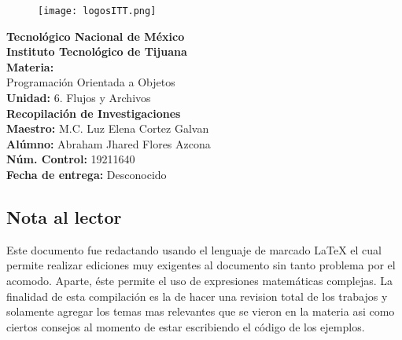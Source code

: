 \documentclass[letterpaper, 12pt]{article}
\begin{document}
    \thispagestyle{empty}
    \begin{figure}[ht]
        \centering
        \texttt{[image: logosITT.png]}
    \end{figure}
    \begin{LARGE}
        \centering
        \textbf{Tecnológico Nacional de México}
        \\
            \bigbreak
        \textbf{Instituto Tecnológico de Tijuana}
        \\
            \bigbreak
            \bigbreak
            \bigbreak
        \textbf{Materia:}
        \\
            \bigbreak
        Programación Orientada a Objetos
        \\
            \bigbreak 
            \bigbreak
            \bigbreak
        \textbf{Unidad:} 6. Flujos y Archivos
        \\
            \bigbreak
            \bigbreak
            \bigbreak 
        \textbf{Recopilación de Investigaciones}
        \\
            \bigbreak
            \bigbreak
            \bigbreak
        \textbf{Maestro:} M.C. Luz Elena Cortez Galvan
        \\
            \bigbreak
            \bigbreak
            \bigbreak 
        \textbf{Alúmno:} Abraham Jhared Flores Azcona
        \\
            \bigbreak
            \bigbreak
            \bigbreak
        \textbf{Núm. Control:} 19211640
        \\
            \bigbreak
            \bigbreak
            \bigbreak
        \textbf{Fecha de entrega:} Desconocido
        \\ 
    \end{LARGE}
    \thispagestyle{empty}

    \newpage
        \setcounter{page}{1}
        \begin{justify}
        \section*{\huge{Nota al lector}}
        Este documento fue redactando usando el lenguaje de marcado \LaTeX{} el cual permite 
        realizar ediciones muy exigentes al documento sin tanto problema por el acomodo. 
        Aparte, éste permite el uso de expresiones matemáticas complejas.
        La finalidad de esta compilación es la de hacer una revision total de los trabajos y solamente agregar
        los temas mas relevantes que se vieron en la materia asi como ciertos consejos al momento de estar escribiendo el código
        de los ejemplos.
        \end{justify}
    
\end{document}
